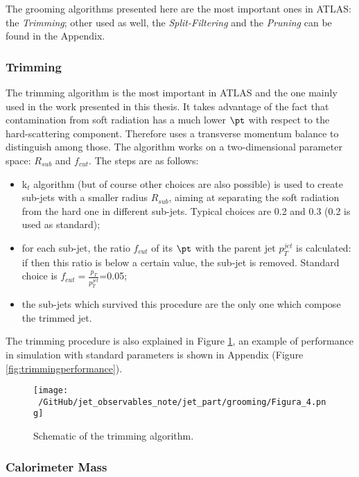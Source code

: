 The grooming algorithms presented here are the most important ones in ATLAS: the \textit{Trimming}; other used as well, the \textit{Split-Filtering} and the \textit{Pruning} can be found in the Appendix.

\subsubsection{Trimming}

The trimming algorithm is the most important in ATLAS and the one mainly used in the work presented in this thesis. It takes advantage of the fact that contamination from soft radiation has a much lower $\pt$ with respect to the hard-scattering component. Therefore uses a transverse momentum balance to distinguish among those. The algorithm works on a two-dimensional parameter space: $R_{sub}$ and $f_{cut}$.
The steps are as follows:
\begin{itemize}
 \item k$_t$ algorithm (but of course other choices are also possible) is used to create sub-jets with a smaller radius $R_{sub}$, aiming at separating the soft radiation from the hard one in different sub-jets. Typical choices are 0.2 and 0.3 (0.2 is used as standard);
 \item for each sub-jet, the ratio $f_{cut}$ of its $\pt$ with the parent jet $p_T^{jet}$ is calculated: if then this ratio is below a certain value, the sub-jet is removed. Standard choice is $f_{cut}=\frac{p_{T}}{p_{T}^{jet}}$=0.05;
 \item the sub-jets which survived this procedure are the only one which compose the trimmed jet.
\end{itemize}

The trimming procedure is also explained in Figure \ref{fig:trimming}, an example of performance in simulation with standard parameters is shown in Appendix (Figure \ref{fig:trimmingperformance}).

\begin{figure}[!ht]
  \centering
      \texttt{[image: ~/GitHub/jet\_observables\_note/jet\_part/grooming/Figura\_4.png]}
  \caption{Schematic of the trimming algorithm.}
  \label{fig:trimming}
\end{figure}


\subsubsection{Calorimeter Mass}

